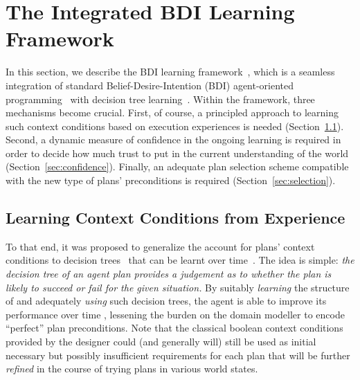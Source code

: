 \section{The Integrated BDI Learning Framework}\label{sec:framework}


In this section, we describe the BDI learning framework~\cite{airiau09:enhancing,singh10:extending,singh10:learning}, which is a seamless integration of standard Belief-Desire-Intention (BDI) agent-oriented programming~\cite{WooldridgeBook} with decision tree learning~\cite{Mitchell97:ML}. 
%
Within the framework, three mechanisms become crucial. First, of course, a principled approach to learning such context conditions based on execution experiences is needed (Section~\ref{sec:context}). Second, a dynamic measure of confidence in the ongoing learning is required in order to decide how much trust to put in the current understanding of the world (Section~\ref{sec:confidence}). Finally, an adequate plan selection scheme compatible with the new type of plans' preconditions is required (Section~\ref{sec:selection}).

\subsection{Learning Context Conditions from Experience}\label{sec:context}
To that end, it was proposed to generalize the account for plans' context conditions to decision trees~\cite{Mitchell97:ML} that can be learnt over time~\cite{airiau09:enhancing,singh10:extending,singh10:learning}. The idea is simple: \emph{the decision tree of an agent plan provides a judgement as to whether the plan is likely to succeed or fail for the given situation.}
By suitably \emph{learning} the structure of and adequately \emph{using} such decision trees, the agent is able to improve its performance over time 
, lessening the burden on
the domain modeller to encode ``perfect'' plan preconditions. Note that the classical boolean context conditions provided by the designer could (and generally will) still be used as initial necessary but possibly insufficient requirements for each plan that will be further \emph{refined} in the course of trying plans in various world states.

